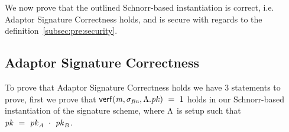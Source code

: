 We now prove that the outlined Schnorr-based instantiation is correct, i.e. Adaptor Signature Correctness holds, and is secure with regards to the definition~\ref{subsec:pre:security}.

\subsection{Adaptor Signature Correctness}\label{subsec:sig:aptsig-correctness}

To prove that Adaptor Signature Correctness holds we have 3 statements to prove, first we prove that $\mathsf{verf}(\mathit{m}, \sigma_{\mathit{fin}}, \Lambda.\mathit{pk}) ~=~ 1$ holds in our
Schnorr-based instantiation of the signature scheme, where $\Lambda$ is setup such that $\mathit{pk} ~=~ \mathit{pk}_{\mathit{A}} ~\cdot~ \mathit{pk}_{\mathit{B}}$.

